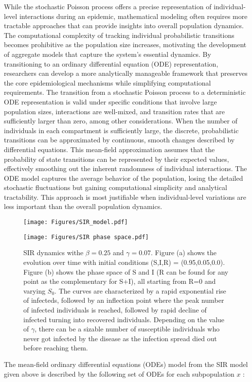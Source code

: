 While the stochastic Poisson process offers a precise representation of individual-level interactions during an epidemic, mathematical modeling often requires more tractable approaches that can provide insights into overall population dynamics. The computational complexity of tracking individual probabilistic transitions becomes prohibitive as the population size increases, motivating the development of aggregate models that capture the system's essential dynamics. By transitioning to an ordinary differential equation (ODE) representation, researchers can develop a more analytically manageable framework that preserves the core epidemiological mechanisms while simplifying computational requirements. %
The transition from a stochastic Poisson process to a deterministic ODE representation is valid under specific conditions that involve large population sizes, interactions are well-mixed, and transition rates that are sufficiently larger than zero, among other considerations.  %
When the number of individuals in each compartment is sufficiently large, the discrete, probabilistic transitions can be approximated by continuous, smooth changes described by differential equations. This mean-field approximation assumes that the probability of state transitions can be represented by their expected values, effectively smoothing out the inherent randomness of individual interactions. The ODE model captures the average behavior of the population, losing the detailed stochastic fluctuations but gaining computational simplicity and analytical tractability. This approach is most justifiable when individual-level variations are less important than the overall population dynamics\cite{armbruster2017elementary}.
\begin{figure}[ht]
    \centering
    \begin{minipage}{0.45\textwidth}
        \centering
        \texttt{[image: Figures/SIR\_model.pdf]}
        \subcaption{}
    \end{minipage}
    \begin{minipage}{0.45\textwidth}
        \centering
        \texttt{[image: Figures/SIR phase space.pdf]}
        \subcaption{}
    \end{minipage}
    \hfill
    \caption{\small SIR dynamics withe $\beta=0.25$ and $\gamma=0.07$. Figure (a) shows the evolution over time with initial conditions (S,I,R) = (0.95,0.05,0.0). Figure (b) shows the phase space of S and I (R can be found for any point as the complementary for S+I), all starting from R=0 and varying $S_0$. The curves are characterized by a rapid exponential rise of infecteds, followed by an inflection point where the peak number of infected individuals is reached, followed by rapid decline of infected turning into recovered individuals. Depending on the value of $\gamma$, there can be a sizable number of susceptible individuals who never got infected by the disease as the infection spread died out before reaching them.}
    \label{fig:SIR Dynamics}
\end{figure}
The mean-field ordinary differential equations (ODEs) model from the SIR model given above is described by the following set of ODEs for each subpopulation $x$ :%


